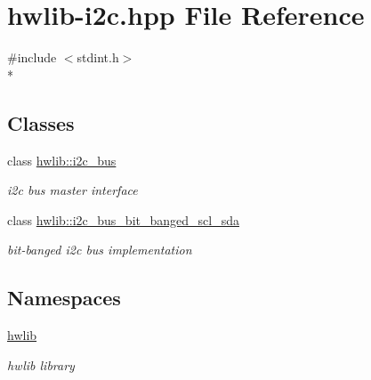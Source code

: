 \hypertarget{hwlib-i2c_8hpp}{}\section{hwlib-\/i2c.hpp File Reference}
\label{hwlib-i2c_8hpp}
{\ttfamily \#include $<$stdint.\+h$>$}\\*
\subsection*{Classes}
\begin{DoxyCompactItemize}
\item 
class \hyperlink{classhwlib_1_1i2c__bus}{hwlib\+::i2c\+\_\+bus}
\begin{DoxyCompactList}\small\item\em i2c bus master interface \end{DoxyCompactList}\item 
class \hyperlink{classhwlib_1_1i2c__bus__bit__banged__scl__sda}{hwlib\+::i2c\+\_\+bus\+\_\+bit\+\_\+banged\+\_\+scl\+\_\+sda}
\begin{DoxyCompactList}\small\item\em bit-\/banged i2c bus implementation \end{DoxyCompactList}\end{DoxyCompactItemize}
\subsection*{Namespaces}
\begin{DoxyCompactItemize}
\item 
 \hyperlink{namespacehwlib}{hwlib}
\begin{DoxyCompactList}\small\item\em hwlib library \end{DoxyCompactList}\end{DoxyCompactItemize}
